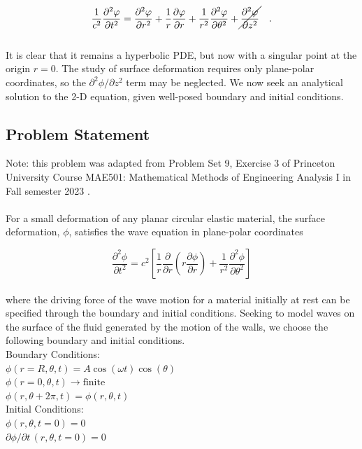 \documentclass{homework}
\begin{document}
\[ \frac{1}{c^2} \frac{\partial^2 \phi }{\partial t^2 } = \frac{\partial^2 \phi }{\partial r^2 } + \frac{1}{r} \frac{\partial \phi }{\partial r} + \frac{1}{r^2 } \frac{\partial^2 \phi }{\partial \theta^2 } + \cancel{\frac{\partial^2 \phi }{\partial z^2 }} \quad .\]
\\ \noindent
It is clear that it remains a hyperbolic PDE, but now with a singular point at the origin $r = 0$. The study of surface deformation requires only plane-polar coordinates, so the $\partial^2 \phi / \partial z^2$ term may be neglected. We now seek an analytical solution to the 2-D equation, given well-posed boundary and initial conditions.
\newpage
\subsection{\textbf{Problem Statement}}
\noindent Note: this problem was adapted from Problem Set 9, Exercise 3 of Princeton University Course MAE501: Mathematical Methods of Engineering Analysis I in Fall semester 2023 \cite{MAE501}.
\\ \\
\noindent For a small deformation of any planar circular elastic material, the surface deformation, $\phi$, satisfies the wave equation in plane-polar coordinates

\[ \frac{\partial^2 \phi}{\partial t^2} = c^2 \left[ \frac{1}{r} \frac{\partial}{\partial r} \left(r \frac{\partial \phi}{\partial r}\right) + \frac{1}{r^2} \frac{\partial^2 \phi}{\partial \theta^2} \right]\]
\\
\noindent where the driving force of the wave motion for a material initially at rest can be specified through the boundary and initial conditions. Seeking to model waves on the surface of the fluid generated by the motion of the walls, we choose the following boundary and initial conditions. \\[8pt]
\noindent Boundary Conditions: \\
$ \phi(r=R, \theta, t) = A \cos(\omega t) \cos (\theta) $ \\
$ \phi(r=0, \theta, t) \rightarrow \textrm{finite} $ \\
$ \phi(r, \theta + 2\pi, t) = \phi(r, \theta, t) $ \\[8pt]
\noindent Initial Conditions: \\
$ \phi(r, \theta, t=0) = 0 $ \\
$ \partial \phi/ \partial t \, (r, \theta, t=0) = 0 $
\end{document}

